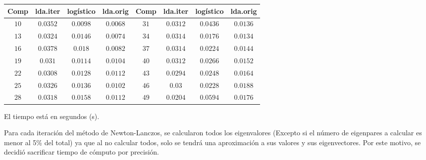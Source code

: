 \begin{center}
\begin{tabular}{ | c | c | c | c ||| c | c | c | c |} 
\hline
Comp & lda.iter & logístico & lda.orig   & Comp & lda.iter & logístico & lda.orig   \\ 
\hline
\hline
$10$ & $0.0352$ & $0.0098$ & $0.0068$ & $31$ & $0.0312$ & $0.0436$ & $0.0136$ \\
$13$ & $0.0324$ & $0.0146$ & $0.0074$ & $34$ & $0.0314$ & $0.0176$ & $0.0134$ \\
$16$ & $0.0378$ & $0.018$ & $0.0082$ & $37$ & $0.0314$ & $0.0224$ & $0.0144$ \\
$19$ & $0.031$ & $0.0114$ & $0.0104$ & $40$  & $0.0312$ & $0.0266$ & $0.0152$ \\
$22$ & $0.0308$ & $0.0128$ & $0.0112$ & $43$ & $0.0294$ & $0.0248$ & $0.0164$ \\
$25$ & $0.0326$ & $0.0136$ & $0.0102$ & $46$ & $0.03$ & $0.0228$ & $0.0188$ \\
$28$ & $0.0318$ & $0.0158$ & $0.0112$ & $49$ & $0.0204$ & $0.0594$ & $0.0176$ \\
\hline
\hline
\end{tabular}
\end{center}

El tiempo está en segundos (s).

Para cada iteración del método de Newton-Lanczos, se calcularon todos los eigenvalores (Excepto si el número de eigenpares a calcular es menor al 5\% del total) ya que al no calcular todos, solo se tendrá una aproximación a sus valores y sus eigenvectores. Por este motivo, se decidió sacrificar tiempo de cómputo por precisión.



